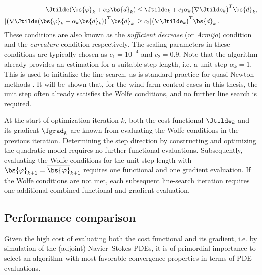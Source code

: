 	\begin{align}
		\Jtilde(\bs{\varphi}_k + \alpha_k \bs{d}_k) &\leq \Jtilde_k + c_1 \alpha_k \big( \nabla \Jtilde_k \big)^T \bs{d}_k, \\
		\vert \big( \nabla\Jtilde(\bs{\varphi}_k + \alpha_k \bs{d}_k) \big)^T \bs{d}_k \vert &\geq c_2 \vert \big( \nabla \Jtilde_k \big)^T \bs{d}_k \vert.
	\end{align}
	These conditions are also known as the \emph{sufficient decrease} (or \emph{Armijo}) condition and the \emph{curvature} condition respectively. The scaling parameters in these conditions are typically chosen as $c_1 = 10^{-4}$ and $c_2 = 0.9$. Note that the algorithm already provides an estimation for a suitable step length, i.e. a unit step $\alpha_k = 1$. This is used to initialize the line search, as is standard practice for quasi-Newton methods \citep{wright1999numerical}. It will be shown that, for the wind-farm control cases in this thesis, the unit step often already satisfies the Wolfe conditions, and no further line search is required.
	
	At the start of optimization iteration $k$, both the cost functional $\Jtilde_k$ and its gradient $\Jgrad_k$  are known from evaluating the Wolfe conditions in the previous iteration. Determining the step direction by constructing and optimizing the quadratic model requires no further functional evaluations. Subsequently, evaluating the Wolfe conditions for the unit step length with $\bs{\varphi}_{k+1} = \overline{\bs{\varphi}}_{k+1}$ requires one functional and one gradient evaluation. If the Wolfe conditions are not met, each subsequent line-search iteration requires one additional combined functional and gradient evaluation. 
	
	\subsection{Performance comparison}\label{sec:problem_performance}
	Given the high cost of evaluating both the cost functional and its gradient, i.e. by simulation of the (adjoint) Navier--Stokes PDEs, it is of primordial importance to select an algorithm with most favorable convergence properties in terms of PDE evaluations.
	
